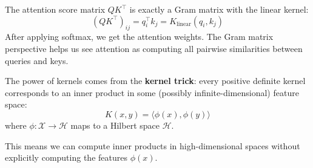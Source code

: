 \begin{remark}
    The attention score matrix $QK^\top$ is exactly a Gram matrix with the linear kernel:
    \[
        (QK^\top)_{ij} = q_i^\top k_j = K_{\text{linear}}(q_i, k_j)
    \]
    After applying softmax, we get the attention weights. The Gram matrix perspective helps us see attention as computing all pairwise similarities between queries and keys.
\end{remark}

\begin{remark}
    The power of kernels comes from the \textbf{kernel trick}: every positive definite kernel corresponds to an inner product in some (possibly infinite-dimensional) feature space:
    \[
        K(x, y) = \langle \phi(x), \phi(y) \rangle
    \]
    where $\phi: \mathcal{X} \to \mathcal{H}$ maps to a Hilbert space $\mathcal{H}$.

    This means we can compute inner products in high-dimensional spaces without explicitly computing the features $\phi(x)$.
\end{remark}

